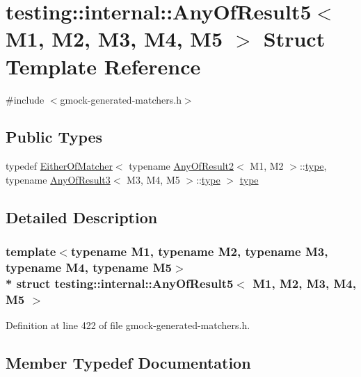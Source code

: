 \hypertarget{structtesting_1_1internal_1_1_any_of_result5}{}\section{testing\+:\+:internal\+:\+:Any\+Of\+Result5$<$ M1, M2, M3, M4, M5 $>$ Struct Template Reference}
\label{structtesting_1_1internal_1_1_any_of_result5}


{\ttfamily \#include $<$gmock-\/generated-\/matchers.\+h$>$}

\subsection*{Public Types}
\begin{DoxyCompactItemize}
\item 
typedef \hyperlink{classtesting_1_1internal_1_1_either_of_matcher}{Either\+Of\+Matcher}$<$ typename \hyperlink{structtesting_1_1internal_1_1_any_of_result2}{Any\+Of\+Result2}$<$ M1, M2 $>$\+::\hyperlink{structtesting_1_1internal_1_1_any_of_result5_a459a06dc5791313dce942668714f0c99}{type}, typename \hyperlink{structtesting_1_1internal_1_1_any_of_result3}{Any\+Of\+Result3}$<$ M3, M4, M5 $>$\+::\hyperlink{structtesting_1_1internal_1_1_any_of_result5_a459a06dc5791313dce942668714f0c99}{type} $>$ \hyperlink{structtesting_1_1internal_1_1_any_of_result5_a459a06dc5791313dce942668714f0c99}{type}
\end{DoxyCompactItemize}


\subsection{Detailed Description}
\subsubsection*{template$<$typename M1, typename M2, typename M3, typename M4, typename M5$>$\\*
struct testing\+::internal\+::\+Any\+Of\+Result5$<$ M1, M2, M3, M4, M5 $>$}



Definition at line 422 of file gmock-\/generated-\/matchers.\+h.



\subsection{Member Typedef Documentation}
